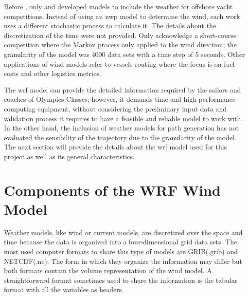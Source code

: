 Before \cite{giannaros2018ultrahigh}, only \cite{philpott2001optimising} and \cite{allsopp2000optimal} developed models to include the weather for offshore yacht competitions. Instead of using an \acrshort{nwp} model to determine the wind, each work uses a different stochastic process to calculate it. The details about the discretization of the time were not provided. Only \cite{philpott2001optimising} acknowledge a short-course competition where the Markov process only applied to the wind direction; the granularity of the model was 4000 data sets with a time step of 5 seconds. %
Other applications of wind models refer to vessels routing where the focus is on fuel costs and other logistics metrics. \par 
The \acrshort{wrf} model can provide the detailed information required by the sailors and coaches of Olympics Classes; however, it demands time and high-performance computing equipment, without considering the preliminary input data and validation process it requires to have a feasible and reliable model to work with. In the other hand, the inclusion of weather models for path generation has not evaluated the sensibility of the trajectory due to the granularity of the model. The next section will provide the details about the \acrshort{wrf} model used for this project as well as its general characteristics. \par %

\section{Components of the WRF Wind Model}
Weather models, like wind or current models, are discretized over the space and time because the data is organized into a four-dimensional grid data sets. The most used computer formats to share this type of models are GRIB(.grib) and NETCDF(.nc). The form in which they organize the information may differ but both formats contain the volume representation of the wind model. A straightforward format sometimes used to share the information is the tabular format with all the variables as headers. \par

